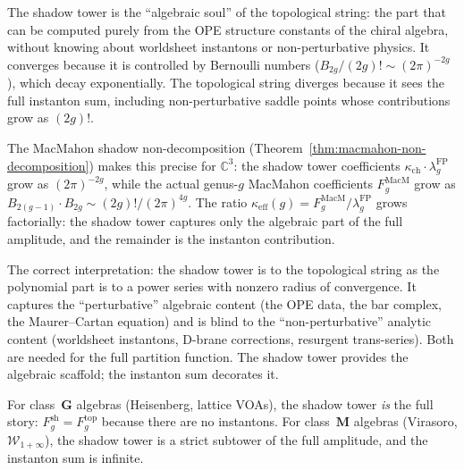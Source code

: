 \documentclass[11pt]{article}
\newcommand{\cW}{\mathcal{W}}
\newcommand{\C}{\mathbb{C}}
\begin{document}
The shadow tower is the ``algebraic soul'' of the topological string: the part that can be computed purely from the OPE structure constants of the chiral algebra, without knowing about worldsheet instantons or non-perturbative physics. It converges because it is controlled by Bernoulli numbers ($B_{2g}/(2g)! \sim (2\pi)^{-2g}$), which decay exponentially. The topological string diverges because it sees the full instanton sum, including non-perturbative saddle points whose contributions grow as $(2g)!$.

The MacMahon shadow non-decomposition (Theorem~\ref{thm:macmahon-non-decomposition}) makes this precise for $\C^3$: the shadow tower coefficients $\kappa_{\mathrm{ch}} \cdot \lambda_g^{\mathrm{FP}}$ grow as $(2\pi)^{-2g}$, while the actual genus-$g$ MacMahon coefficients $F_g^{\mathrm{MacM}}$ grow as $B_{2(g-1)} \cdot B_{2g} \sim (2g)!/(2\pi)^{4g}$. The ratio $\kappa_{\mathrm{eff}}(g) = F_g^{\mathrm{MacM}} / \lambda_g^{\mathrm{FP}}$ grows factorially: the shadow tower captures only the algebraic part of the full amplitude, and the remainder is the instanton contribution.

\begin{remark}
The correct interpretation: the shadow tower is to the topological string as the polynomial part is to a power series with nonzero radius of convergence. It captures the ``perturbative'' algebraic content (the OPE data, the bar complex, the Maurer--Cartan equation) and is blind to the ``non-perturbative'' analytic content (worldsheet instantons, D-brane corrections, resurgent trans-series). Both are needed for the full partition function. The shadow tower provides the algebraic scaffold; the instanton sum decorates it.

For class~$\mathbf{G}$ algebras (Heisenberg, lattice VOAs), the shadow tower \emph{is} the full story: $F_g^{\mathrm{sh}} = F_g^{\mathrm{top}}$ because there are no instantons. For class~$\mathbf{M}$ algebras (Virasoro, $\cW_{1+\infty}$), the shadow tower is a strict subtower of the full amplitude, and the instanton sum is infinite.
\end{remark}

\end{document}
